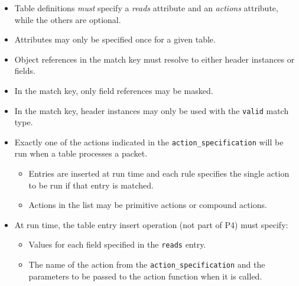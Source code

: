 \documentclass[12pt]{article}
\begin{document}
\begin{itemize}
\item
Table definitions \textit{must} specify a \textit{reads} attribute and 
an \textit{actions} attribute, while the others are optional.
\item
Attributes may only be specified once for a given table.
\item
Object references in the match key must resolve to either header instances or
fields.
\item
In the match key, only field references may be masked.
\item
In the match key, header instances may only be used with the \texttt{valid}
match type.
\item
Exactly one of the actions indicated in the \texttt{action_specification}
will be run when a table processes a packet.

\begin{itemize}
\item
Entries are inserted at run time and each rule specifies the single action 
to be run if that entry is matched.
\item
Actions in the list may be primitive actions or compound actions.
\end{itemize}

\item
At run time, the table entry insert operation (not part of P4) must specify:

\begin{itemize}
\item
Values for each field specified in the \texttt{reads} entry.
\item
The name of the action from the \texttt{action_specification} and the
parameters to be passed to the action function when it is called.
\end{itemize}


\end{itemize}
\end{document}
